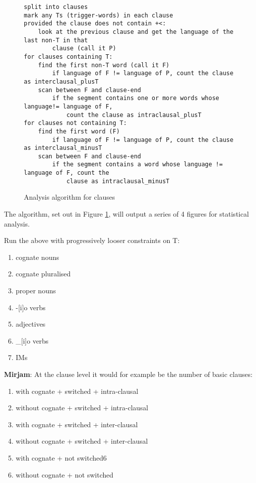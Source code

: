 \documentclass[a4paper,10pt]{article}
\begin{document}
\begin{figure}[h]
\begin{BVerbatim}[tabsize=4, fontsize=\relsize{-1}]
split into clauses
mark any Ts (trigger-words) in each clause
provided the clause does not contain +<:
    look at the previous clause and get the language of the last non-T in that 
        clause (call it P)
for clauses containing T:
    find the first non-T word (call it F)
        if language of F != language of P, count the clause as interclausal_plusT
    scan between F and clause-end
        if the segment contains one or more words whose language!= language of F, 
            count the clause as intraclausal_plusT
for clauses not containing T:
    find the first word (F)
        if language of F != language of P, count the clause as interclausal_minusT
    scan between F and clause-end
        if the segment contains a word whose language != language of F, count the 
            clause as intraclausal_minusT
\end{BVerbatim}
\caption{Analysis algorithm for clauses}
\label{clause_algorithm}
\end{figure}

The algorithm, set out in Figure \ref{clause_algorithm}, will output a series of 4 figures for statistical analysis.

Run the above with progressively looser constraints on T: 
\begin{enumerate}
\itemsep-0.4em 
\item cognate nouns
\item cognate pluralised
\item proper nouns
\item -[i]o verbs
\item adjectives
\item \_[i]o verbs
\item IMs   
\end{enumerate}

\textbf{Mirjam}: At the clause level it would for example be the number of basic clauses:
\begin{enumerate}
\itemsep-0.4em 
\item with cognate + switched + intra-clausal
\item without cognate + switched + intra-clausal
\item with cognate + switched + inter-clausal
\item without cognate + switched + inter-clausal
\item with cognate + not switched6
\item without cognate + not switched
\end{enumerate}
\end{document}
